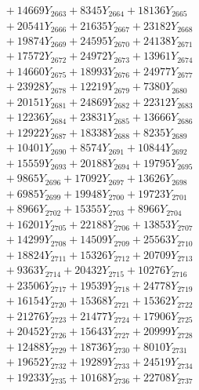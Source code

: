 \documentclass[a4paper,10pt]{article}
\begin{document}
{\begin{align}
&\;  + 14669 Y_{2663} + 8345 Y_{2664} + 18136 Y_{2665} \\[0.3ex]
&\;  + 20541 Y_{2666} + 21635 Y_{2667} + 23182 Y_{2668} \\[0.5ex]\allowbreak
&\;  + 19874 Y_{2669} + 24595 Y_{2670} + 24138 Y_{2671} \\[0.3ex]
&\;  + 17572 Y_{2672} + 24972 Y_{2673} + 13961 Y_{2674} \\[0.3ex]
&\;  + 14660 Y_{2675} + 18993 Y_{2676} + 24977 Y_{2677} \\[0.3ex]
&\;  + 23928 Y_{2678} + 12219 Y_{2679} + 7380 Y_{2680} \\[0.3ex]
&\;  + 20151 Y_{2681} + 24869 Y_{2682} + 22312 Y_{2683} \\[0.3ex]
&\;  + 12236 Y_{2684} + 23831 Y_{2685} + 13666 Y_{2686} \\[0.3ex]
&\;  + 12922 Y_{2687} + 18338 Y_{2688} + 8235 Y_{2689} \\[0.3ex]
&\;  + 10401 Y_{2690} + 8574 Y_{2691} + 10844 Y_{2692} \\[0.3ex]
&\;  + 15559 Y_{2693} + 20188 Y_{2694} + 19795 Y_{2695} \\[0.3ex]
&\;  + 9865 Y_{2696} + 17092 Y_{2697} + 13626 Y_{2698} \\[0.5ex]\allowbreak
&\;  + 6985 Y_{2699} + 19948 Y_{2700} + 19723 Y_{2701} \\[0.3ex]
&\;  + 8966 Y_{2702} + 15355 Y_{2703} + 8966 Y_{2704} \\[0.3ex]
&\;  + 16201 Y_{2705} + 22188 Y_{2706} + 13853 Y_{2707} \\[0.3ex]
&\;  + 14299 Y_{2708} + 14509 Y_{2709} + 25563 Y_{2710} \\[0.3ex]
&\;  + 18824 Y_{2711} + 15326 Y_{2712} + 20709 Y_{2713} \\[0.3ex]
&\;  + 9363 Y_{2714} + 20432 Y_{2715} + 10276 Y_{2716} \\[0.3ex]
&\;  + 23506 Y_{2717} + 19539 Y_{2718} + 24778 Y_{2719} \\[0.3ex]
&\;  + 16154 Y_{2720} + 15368 Y_{2721} + 15362 Y_{2722} \\[0.3ex]
&\;  + 21276 Y_{2723} + 21477 Y_{2724} + 17906 Y_{2725} \\[0.3ex]
&\;  + 20452 Y_{2726} + 15643 Y_{2727} + 20999 Y_{2728} \\[0.5ex]\allowbreak
&\;  + 12488 Y_{2729} + 18736 Y_{2730} + 8010 Y_{2731} \\[0.3ex]
&\;  + 19652 Y_{2732} + 19289 Y_{2733} + 24519 Y_{2734} \\[0.3ex]
&\;  + 19233 Y_{2735} + 10168 Y_{2736} + 22708 Y_{2737} \\[0.3ex]

\end{align}}
\end{document}
